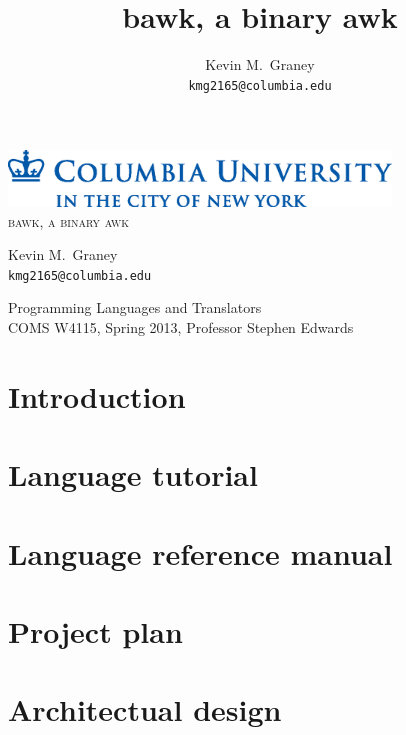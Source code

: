 \documentclass[letterpaper,11pt]{report}
\title{bawk, a binary awk}
\author{
	Kevin M.\ Graney\\
	\texttt{kmg2165@columbia.edu}
}
\begin{document}
\begin{titlepage}
\begin{center}
\includegraphics[width=4in]{columbia_university.eps}
~\\\vspace{1.75in}
\Huge
\textsc{bawk, a binary awk}

\vspace{1in}
\LARGE
Kevin M.\ Graney\\
\texttt{kmg2165@columbia.edu}

\Large
\vspace{1.75in}
Programming Languages and Translators\\
COMS W4115, Spring 2013, Professor Stephen Edwards

\end{center}
\vfill
\end{titlepage}
\tableofcontents
\lstlistoflistings

\chapter{Introduction}


\chapter{Language tutorial}


\chapter{Language reference manual}


\chapter{Project plan}


\chapter{Architectual design}

\end{document}
